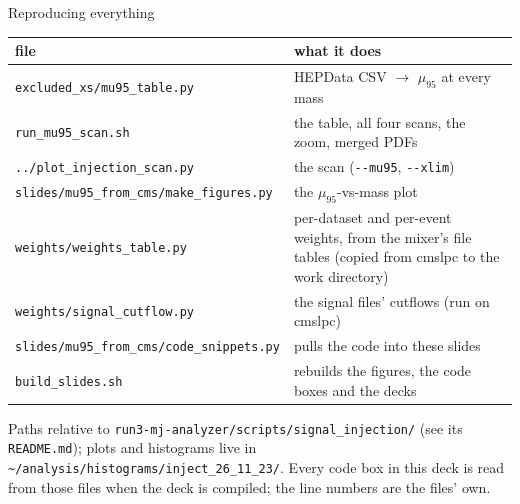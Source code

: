 \documentclass[aspectratio=169,12pt]{beamer}
\begin{document}
\begin{frame}{Reproducing everything}
  \scriptsize
  \begin{tabular}{@{}p{}p{}@{}}
    \toprule
    file & what it does \\
    \midrule
    \texttt{excluded\_xs/mu95\_table.py} & HEPData CSV $\to$ $\mu_{95}$ at every mass \\
    \texttt{run\_mu95\_scan.sh} & the table, all four scans, the zoom, merged PDFs \\
    \texttt{../plot\_injection\_scan.py} & the scan
      (\texttt{-{}-mu95}, \texttt{-{}-xlim}) \\
    \texttt{slides/mu95\_from\_cms/make\_figures.py} & the $\mu_{95}$-vs-mass plot \\
    \texttt{weights/weights\_table.py} & per-dataset and per-event weights, from
      the mixer's file tables (copied from cmslpc to the work directory) \\
    \texttt{weights/signal\_cutflow.py} & the signal files' cutflows (run on cmslpc) \\
    \texttt{slides/mu95\_from\_cms/code\_snippets.py} & pulls the code into these slides \\
    \texttt{build\_slides.sh} & rebuilds the figures, the code boxes and the decks \\
    \bottomrule
  \end{tabular}
  \vspace{1em}

  \small Paths relative to \texttt{run3-mj-analyzer/scripts/signal\_injection/}
  (see its \texttt{README.md}); plots and histograms live in
  \texttt{\textasciitilde/analysis/histograms/inject\_26\_11\_23/}. Every code box
  in this deck is read from those files when the deck is compiled; the line
  numbers are the files' own.
\end{frame}
\end{document}
